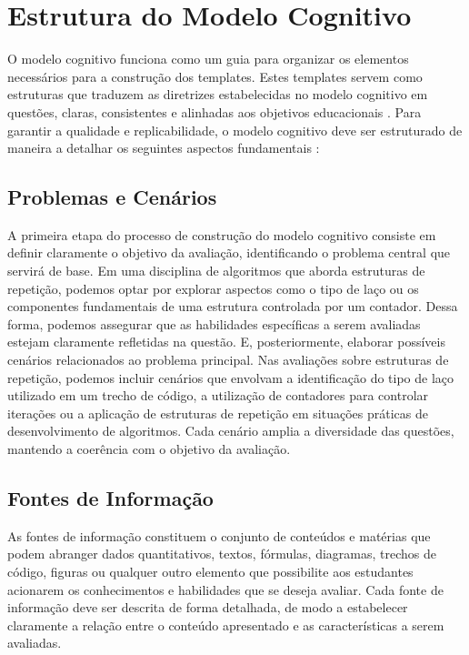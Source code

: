 \section{Estrutura do Modelo Cognitivo}

O modelo cognitivo funciona como um guia para organizar os elementos necessários para a construção dos templates. Estes templates servem como estruturas que traduzem as diretrizes estabelecidas no modelo cognitivo em questões, claras, consistentes e alinhadas aos objetivos educacionais \parencite{keehner2017, gierl2017}. Para garantir a qualidade e replicabilidade, o modelo cognitivo deve ser estruturado de maneira a detalhar os seguintes aspectos fundamentais : 

\subsection{Problemas e Cenários}

A primeira etapa do processo de construção do modelo cognitivo consiste em definir claramente o objetivo da avaliação, identificando o problema central que servirá de base. Em uma disciplina de algoritmos que aborda estruturas de repetição, podemos optar por explorar aspectos como o tipo de laço ou os componentes fundamentais de uma estrutura controlada por um contador. Dessa forma, podemos assegurar que as habilidades específicas a serem avaliadas estejam claramente refletidas na questão. E, posteriormente, elaborar possíveis cenários relacionados ao problema principal. Nas avaliações sobre estruturas de repetição, podemos incluir cenários que envolvam a identificação do tipo de laço utilizado em um trecho de código, a utilização de contadores para controlar iterações ou a aplicação de estruturas de repetição em situações práticas de desenvolvimento de algoritmos. Cada cenário amplia a diversidade das questões, mantendo a coerência com o objetivo da avaliação.

\subsection{Fontes de Informação}

As fontes de informação constituem o conjunto de conteúdos e matérias que podem abranger dados quantitativos, textos, fórmulas, diagramas, trechos de código, figuras ou qualquer outro elemento que possibilite aos estudantes acionarem os conhecimentos e habilidades que se deseja avaliar. Cada fonte de informação deve ser descrita de forma detalhada, de modo a estabelecer claramente a relação entre o conteúdo apresentado e as características a serem avaliadas.


